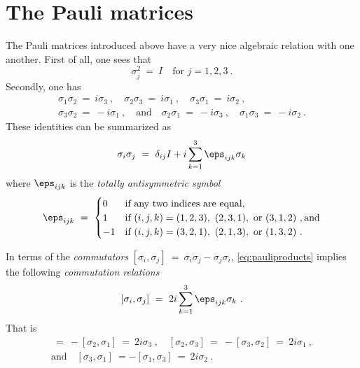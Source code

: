 \documentclass[12pt]{amsart}
\numberwithin{equation}{section}
\numberwithin{figure}{section}
\theoremstyle{theorem}
\begin{document}
\section{The Pauli matrices} The Pauli matrices introduced above have a very 
nice algebraic relation with one another.  First of all, one sees that
$$ \sigma_j^2 \ = \ I \quad \text{for } j=1,2,3 \ . $$
Secondly, one has 
\begin{multline*} \sigma_1 \sigma_2 \ = \ i \sigma_3 \ , \quad \sigma_2 
\sigma_3 \ = \ i \sigma_1 \ , \quad \sigma_3 \sigma_1 \ = \ i \sigma_2 \ , \\
	\sigma_3 \sigma_2 \ = \ - i 
	\sigma_1 \ , \quad \text{and} \quad \sigma_2 \sigma_1 \ = \ -i \sigma_3 \ , 
	\quad  \sigma_1 \sigma_3 \ = \ -i \sigma_2 \  .
	\end{multline*}
These identities can be summarized as
\begin{equation}\label{eq:pauliproducts}
	\sigma_{i}\sigma_j \ = \ \delta_{ij} I + i \sum_{k=1}^3 \eps_{ijk}\sigma_k
\end{equation}
where $\eps_{ijk}$ is the \emph{totally antisymmetric symbol}
\begin{equation}\label{eq:eps}
	\eps_{ijk} \ = \ \begin{cases} 0 & \text{if any two indices are equal,} \\
		1 & \text{if } (i,j,k) = (1,2,3), \ (2,3,1),\ \text{or}\ (3,1,2) \ , 
		\text{and} \\
		-1 & \text{if } (i,j,k) = (3,2,1), \ (2,1,3),\ \text{or}\ (1,3,2) \ .
	\end{cases}
\end{equation}

In terms of the \emph{commutators} $[\sigma_i,\sigma_j] \ = \ \sigma_i \sigma 
_j -\sigma_j \sigma_i$, \eqref{eq:pauliproducts} implies the following 
\emph{commutation relations}
\begin{equation}\label{eq:paulicommutators}
	[\sigma_i,\sigma_j] \ = \ 2i \sum_{k=1}^3 \eps_{ijk} \sigma_k \ .
\end{equation}
That is 
\begin{multline*}
	[\sigma_1,\sigma_2]\ = \ - [\sigma_2,\sigma_1] \ = \ 2i\sigma_3 \ , \quad 
	[\sigma_2,\sigma_3]\ = \ -[\sigma_3, \sigma_2] \ = \ 2i \sigma_1 \ , \\
	\text{and} \quad [\sigma_3,\sigma_1] \ = - [\sigma_1,\sigma_3] \ = \ 2i 
	\sigma_2 \ .
\end{multline*}
\end{document}

